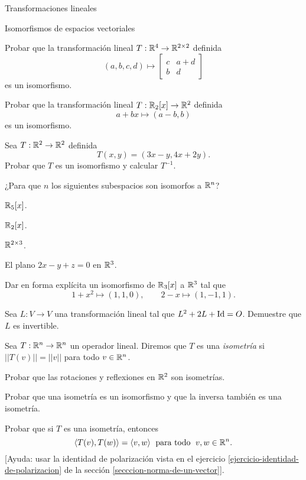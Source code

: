 \begin{chapter}{Transformaciones lineales}
\begin{section}{Isomorfismos de espacios vectoriales}
    \begin{enumex}
        \item Probar que la transformación lineal $T: \mathbb R^4 \to \mathbb R^{2 \times 2}$  definida
        $$
        (a,b,c,d) \mapsto \begin{bmatrix}
            c&a+d\\ b&d
        \end{bmatrix}
        $$
        es un isomorfismo. 
        \item Probar que la transformación lineal $T: \mathbb R_2[x] \to \mathbb R^{2}$  definida
        $$
        a+bx \mapsto (a-b,b)
        $$
        es un isomorfismo. 
        \item Sea $T: \mathbb R^2 \to \mathbb R^{2}$ definida
        $$
        T(x, y) = (3x - y, 4x + 2y).
        $$
        Probar que $T$ es un isomorfismo y calcular $T^{-1}$.
        \item ¿Para que $n$ los siguientes subespacios son isomorfos a $\mathbb R^n$?
        \begin{enumex}
            \item $\mathbb R_5[x]$.
            \item $\mathbb R_2[x]$.
            \item $\mathbb R^{2 \times 3}$.
            \item El plano $2x-y+z=0$ en $\mathbb R^3$.
        \end{enumex}
        \item Dar en forma explícita un isomorfismo de $\mathbb R_3[x]$ a $\mathbb R^3$ tal que
        $$
        1 +x^2 \mapsto (1,1,0), \qquad 2-x \mapsto (1, -1, 1).
        $$
        \item Sea $L: V \to V$ una transformación lineal tal que $L^2 + 2L + \operatorname{Id} = O$. Demuestre que $L$ es invertible.
        \item\label{ejercicio-isometria} Sea $T: \mathbb R^n \to \mathbb R^n$ un operador lineal. Diremos que $T$  es una  \textit{isometría} si $||T(v)|| = ||v||$ para todo $v \in \mathbb R^n$. 
            \begin{enumex}
                \item Probar que las rotaciones y reflexiones en $\mathbb R^2$ son isometrías. 
                \item Probar que una isometría es un isomorfismo y  que la inversa también es una isometría.
                \item Probar que si $T$ es una isometría,  entonces
                $$
                \langle T(v), T(w) \rangle = \langle v,w \rangle \; \text{ para todo } \; v,w \in \mathbb R^n.  
                $$
                [Ayuda: usar la identidad de polarización  vista en el ejercicio \ref{ejercicio-identidad-de-polarizacion} de la sección \ref{secccion-norma-de-un-vector}].
            \end{enumex}
            

\end{enumex}
\end{section}
\end{chapter}
